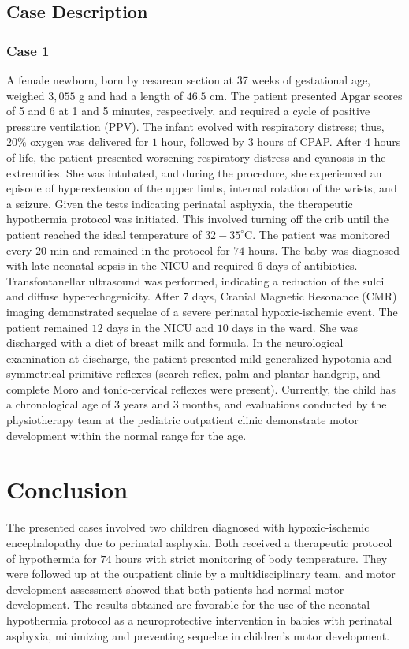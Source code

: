 \documentclass[11pt,a4paper]{article}
\begin{document}
	\subsection{Case Description}
	\subsubsection{Case 1}
	A female newborn, born by cesarean section at 37 weeks of gestational age, weighed $3,055$ g and had a length of $46.5$ cm. The patient presented Apgar scores of 5 and 6 at 1 and 5 minutes, respectively, and required a cycle of positive pressure ventilation (PPV). The infant evolved with respiratory distress; thus, $20\%$ oxygen was delivered for $1$ hour, followed by $3$ hours of CPAP. After $4$ hours of life, the patient presented worsening respiratory distress and cyanosis in the extremities. She was intubated, and during the procedure, she experienced an episode of hyperextension of the upper limbs, internal rotation of the wrists, and a seizure. Given the tests indicating perinatal asphyxia, the therapeutic hypothermia protocol was initiated. This involved turning off the crib until the patient reached the ideal temperature of $32-35^{\circ}$C. The patient was monitored every $20$ min and remained in the protocol for $74$ hours. The baby was diagnosed with late neonatal sepsis in the NICU and required 6 days of antibiotics. Transfontanellar ultrasound was performed, indicating a reduction of the sulci and diffuse hyperechogenicity. After $7$ days, Cranial Magnetic Resonance (CMR) imaging demonstrated sequelae of a severe perinatal hypoxic-ischemic event. The patient remained $12$ days in the NICU and $10$ days in the ward. She was discharged with a diet of breast milk and formula. In the neurological examination at discharge, the patient presented mild generalized hypotonia and symmetrical primitive reflexes (search reflex, palm and plantar handgrip, and complete Moro and tonic-cervical reflexes were present). Currently, the child has a chronological age of 3 years and 3 months, and evaluations conducted by the physiotherapy team at the pediatric outpatient clinic demonstrate motor development within the normal range for the age.
		
	\section{Conclusion}
	The presented cases involved two children diagnosed with hypoxic-ischemic encephalopathy due to perinatal asphyxia. Both received a therapeutic protocol of hypothermia for $74$ hours with strict monitoring of body temperature. They were followed up at the outpatient clinic by a multidisciplinary team, and motor development assessment showed that both patients had normal motor development. The results obtained are favorable for the use of the neonatal hypothermia protocol as a neuroprotective intervention in babies with perinatal asphyxia, minimizing and preventing sequelae in children's motor development.
	
	\newpage
	
	\printbibliography[title=References]
		
\end{document}
